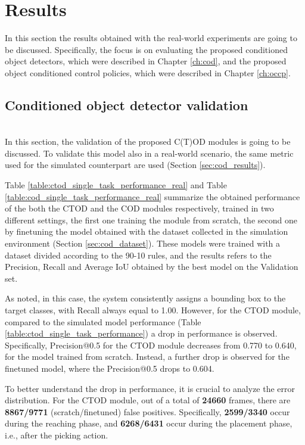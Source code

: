 \section{Results}
\label{sec:real_results}
In this section the results obtained with the real-world experiments are going to be discussed.
Specifically, the focus is on evaluating the proposed conditioned object detectors, which were described in Chapter \ref{ch:cod}, and the proposed object conditioned control policies, which were described in Chapter \ref{ch:occp}.

\subsection{Conditioned object detector validation}\mbox{}\\
In this section, the validation of the proposed C(T)OD modules is going to be discussed. To validate this model also in a real-world scenario, the same metric used for the simulated counterpart are used (Section \ref{sec:cod_results}). 

Table \ref{table:ctod_single_task_performance_real} and Table \ref{table:cod_single_task_performance_real} summarize the obtained performance of the both the CTOD and the COD modules respectively, trained in two different settings, the first one training the module from scratch, the second one by finetuning the model obtained with the dataset collected in the simulation environment (Section \ref{sec:cod_dataset}). These models were trained with a dataset divided according to the 90-10 rules, and the results refers to the Precision, Recall and Average IoU obtained by the best model on the Validation set.




As noted, in this case, the system consistently assigns a bounding box to the target classes, with Recall always equal to 1.00. However, for the CTOD module, compared to the simulated model performance (Table \ref{table:ctod_single_task_performance}) a drop in performance is observed. Specifically, Precision@0.5 for the CTOD module decreases from 0.770 to 0.640, for the model trained from scratch. Instead, a further drop is observed for the finetuned model, where the Precision@0.5 drops to 0.604.

To better understand the drop in performance, it is crucial to analyze the error distribution. For the CTOD module, out of a total of \textbf{24660} frames, there are \textbf{8867/9771} (scratch/finetuned) false positives. Specifically, \textbf{2599/3340} occur during the reaching phase, and \textbf{6268/6431} occur during the placement phase, i.e., after the picking action. 

